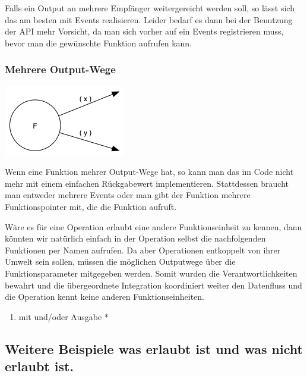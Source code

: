 \documentclass[11pt]{article}
\begin{document}
Falls ein Output an mehrere Empfänger weitergereicht werden soll, so lässt sich das am besten mit Events realisieren.
Leider bedarf es dann bei der Benutzung der API mehr Vorsicht, da man sich vorher auf ein Events registrieren muss, bevor man
die gewünschte Funktion aufrufen kann.
\subsubsection{Mehrere Output-Wege}
\label{sec:orgheadline32}

\includegraphics[width=.9\linewidth]{./img/diagramOut2.png}

Wenn eine Funktion mehrer Output-Wege hat, so kann man das im Code nicht mehr mit einem einfachen Rückgabewert implementieren.
Stattdessen braucht man entweder mehrere Events oder man gibt der Funktion mehrere Funktionspointer mit, die die Funktion aufruft.

Wäre es für eine Operation erlaubt eine andere Funktionseinheit zu kennen, dann könnten wir natürlich einfach in der Operation selbst
die nachfolgenden Funktionen per Namen aufrufen. Da aber Operationen entkoppelt von ihrer Umwelt sein sollen, müssen die möglichen
Outputwege über die Funktionsparameter mitgegeben werden. Somit wurden die Verantwortlichkeiten bewahrt und die übergeordnete 
Integration koordiniert weiter den Datenfluss und die Operation kennt keine anderen Funktionseinheiten.


\begin{enumerate}
\item mit und/oder Ausgabe
\label{sec:orgheadline31}
*
\end{enumerate}
\subsection{Weitere Beispiele was erlaubt ist und was nicht erlaubt ist.}
\label{sec:orgheadline35}
\end{document}

